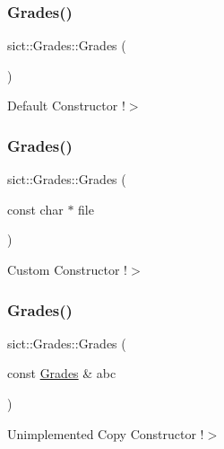 \subsubsection{\texorpdfstring{Grades()}{Grades()}\hspace{0.1cm}{\footnotesize\ttfamily [1/4]}}
{\footnotesize\ttfamily sict\+::\+Grades\+::\+Grades (\begin{DoxyParamCaption}{ }\end{DoxyParamCaption})}

Default Constructor !$>$ \mbox{\label{classsict_1_1_grades_a1b5df6f2878969fd2ac5bb7181e72013}} 
\subsubsection{\texorpdfstring{Grades()}{Grades()}\hspace{0.1cm}{\footnotesize\ttfamily [2/4]}}
{\footnotesize\ttfamily sict\+::\+Grades\+::\+Grades (\begin{DoxyParamCaption}\item[{const char $\ast$}]{file }\end{DoxyParamCaption})}

Custom Constructor !$>$ \mbox{\label{classsict_1_1_grades_a28b396a5f92668d17c77e6e27049ffbd}} 
\subsubsection{\texorpdfstring{Grades()}{Grades()}\hspace{0.1cm}{\footnotesize\ttfamily [3/4]}}
{\footnotesize\ttfamily sict\+::\+Grades\+::\+Grades (\begin{DoxyParamCaption}\item[{const \mbox{\hyperlink{classsict_1_1_grades}{Grades}} \&}]{abc }\end{DoxyParamCaption})\hspace{0.3cm}{\ttfamily [delete]}}

Unimplemented Copy Constructor !$>$ \mbox{\label{classsict_1_1_grades_a12f36a6da97e7ecf0360526e6f766cfa}} 
